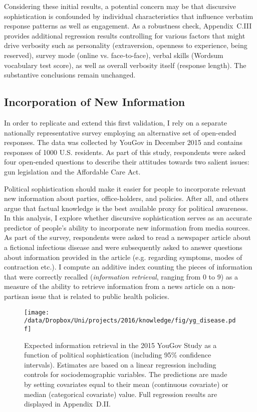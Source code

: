 Considering these initial results, a potential concern may be that discursive sophistication is confounded by individual characteristics that influence verbatim response patterns as well as engagement. As a robustness check, Appendix~C.III provides additional regression results controlling for various factors that might drive verbosity such as personality (extraversion, openness to experience, being reserved), survey mode (online vs. face-to-face), verbal skills (Wordsum vocabulary test score), as well as overall verbosity itself (response length). The substantive conclusions remain unchanged.


\subsection*{Incorporation of New Information}
In order to replicate and extend this first validation, I rely on a separate nationally representative survey employing an alternative set of open-ended responses. The data was collected by YouGov in December 2015 and contains responses of 1000 U.S. residents. %
As part of this study, respondents were asked four open-ended questions to describe their attitudes towards two salient issues: gun legislation and the Affordable Care Act.


Political sophistication should make it easier for people to incorporate relevant new information about parties, office-holders, and policies. After all,  \citet{zaller1990political,zaller1992nature} and others argue that factual knowledge is the best available proxy for political awareness. In this analysis, I explore whether discursive sophistication serves as an accurate predictor of people's ability to incorporate new information from media sources. As part of the survey, respondents were asked to read a newspaper article about a fictional infectious disease and were subsequently asked to answer questions about information provided in the article (e.g. regarding symptoms, modes of contraction etc.). I compute an additive index counting the pieces of information that were correctly recalled (\textit{information retrieval}, ranging from 0 to 9) as a measure of the ability to retrieve information from a news article on a non-partisan issue that is related to public health policies. 

\begin{figure}[h]\centering
\texttt{[image: /data/Dropbox/Uni/projects/2016/knowledge/fig/yg\_disease.pdf]}
\caption[Expected information retrieval in the 2015 YouGov Study as a function of political sophistication]{Expected information retrieval in the 2015 YouGov Study as a function of political sophistication (including 95\% confidence intervals). Estimates are based on a linear regression including controls for sociodemographic variables. The predictions are made by setting covariates equal to their mean (continuous covariate) or median (categorical covariate) value. Full regression results are displayed in Appendix~D.II.}\label{fig:yg_disease}
\end{figure}

